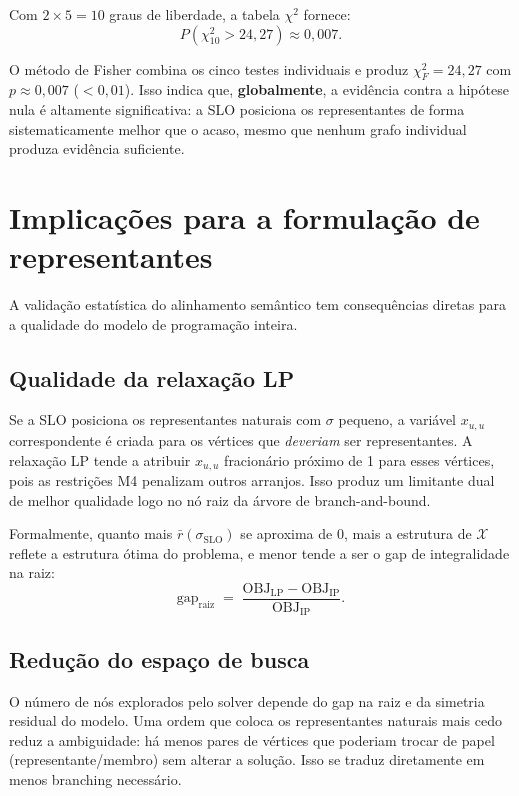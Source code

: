 \documentclass[a4paper,11pt]{article}
\begin{document}
Com $2 \times 5 = 10$ graus de liberdade, a tabela $\chi^2$ fornece:
\[
  P(\chi^2_{10} > 24{,}27) \approx 0{,}007.
\]

\begin{resultado}
O método de Fisher combina os cinco testes individuais e produz
$\chi^2_F = 24{,}27$ com $p \approx 0{,}007$ ($< 0{,}01$). Isso
indica que, \textbf{globalmente}, a evidência contra a hipótese nula
é altamente significativa: a SLO posiciona os representantes de forma
sistematicamente melhor que o acaso, mesmo que nenhum grafo individual
produza evidência suficiente.
\end{resultado}

\section{Implicações para a formulação de representantes}

A validação estatística do alinhamento semântico tem consequências
diretas para a qualidade do modelo de programação inteira.

\subsection{Qualidade da relaxação LP}

Se a SLO posiciona os representantes naturais com $\sigma$ pequeno,
a variável $x_{u,u}$ correspondente é criada para os vértices que
\emph{deveriam} ser representantes. A relaxação LP tende a atribuir
$x_{u,u}$ fracionário próximo de 1 para esses vértices, pois as
restrições M4 penalizam outros arranjos. Isso produz um limitante dual
de melhor qualidade logo no nó raiz da árvore de branch-and-bound.

Formalmente, quanto mais $\bar{r}(\sigma_{\text{SLO}})$ se aproxima
de 0, mais a estrutura de $\mathcal{X}$ reflete a estrutura ótima do
problema, e menor tende a ser o gap de integralidade na raiz:
\[
  \text{gap}_{\text{raiz}} \;=\;
  \frac{\text{OBJ}_{\text{LP}} - \text{OBJ}_{\text{IP}}}
       {\text{OBJ}_{\text{IP}}}.
\]

\subsection{Redução do espaço de busca}

O número de nós explorados pelo solver depende do gap na raiz e da
simetria residual do modelo. Uma ordem que coloca os representantes
naturais mais cedo reduz a ambiguidade: há menos pares de vértices
que poderiam trocar de papel (representante/membro) sem alterar a
solução. Isso se traduz diretamente em menos branching necessário.
\end{document}

